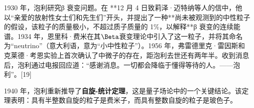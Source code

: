 1930 年，泡利研究β 衰变问题。在 **12 月 4 日致莉泽·迈特纳等人的信中，他以“亲爱的放射性女士们和先生们”开头，并提出了一种**尚未被观测到的中性粒子的假设，该粒子的质量极小，不超过质子质量的 1\%，以解释**β 衰变的连续能谱。1934 年，恩里科·费米在其\(\Beta\)衰变理论中引入了这一粒子，并将其命名为“neutrino”（意大利语，意为“小中性粒子”）。1956 年，弗雷德里克·雷因斯和克莱德·考恩实验上首次确认了中微子的存在，距泡利去世还有两年半。收到消息后，泡利通过电报回应道：“感谢消息。一切都会降临于懂得等待的人。——泡利”。[19]

1940 年，泡利重新推导了\textbf{自旋-统计定理}，这是量子场论中的一个关键结论。该定理表明：具有半整数自旋的粒子是费米子，而具有整数自旋的粒子是玻色子。